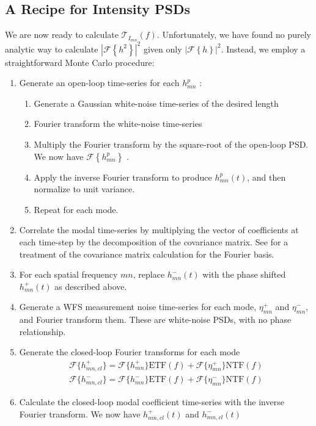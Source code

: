 \documentclass[11pt,preprint]{aastex}
\begin{document}
\subsection{A Recipe for Intensity PSDs}
We are now ready to calculate $\mathcal{T}_{I_{mn}}(f)$.  Unfortunately, we have found no purely analytic way to calculate $\left| \mathcal{F}\left\{ h^2 \right\} \right|^2$ given only $\left| \mathcal{F}\left\{ h \right\} \right|^2$.  Instead, we employ a straightforward Monte Carlo procedure:
\begin{enumerate}
\item Generate an open-loop time-series for each $h_{mn}^p$ \label{step:olh}:
\begin{enumerate}
\item Generate a Gaussian white-noise time-series of the desired length
\item Fourier transform the white-noise time-series
\item Multiply the Fourier transform by the square-root of the open-loop PSD.  We now have $\mathcal{F}\left\{h_{mn}^p\right\}$ \citep[cf.][]{kasdin_falpha}.
\item Apply the inverse Fourier transform to produce $h_{mn}^p(t)$, and then normalize to unit variance.
\item Repeat for each mode.
\end{enumerate}
\item Correlate the modal time-series by multiplying the vector of coefficients at each time-step by the decomposition of the covariance matrix.  See \citet{2018JATIS...4a9001M} for a treatment of the covariance matrix calculation for the Fourier basis.
\item For each spatial frequency $mn$, replace $h_{mn}^-(t)$ with the phase shifted $h_{mn}^+(t)$ as described above.
\item Generate a WFS measurement noise time-series for each mode, $\eta_{mn}^+$ and $\eta_{mn}^-$, and Fourier transform them.  These are white-noise PSDs, with no phase relationship.
\item Generate the closed-loop Fourier transforms for each mode \label{step:clh}
\begin{eqnarray}
\mathcal{F}\{h_{mn,cl}^+\} = \mathcal{F}\{h_{mn}^+\} \mathrm{ETF}(f) + \mathcal{F}\{\eta_{mn}^+\} \mathrm{NTF}(f) \\
\mathcal{F}\{h_{mn,cl}^-\} = \mathcal{F}\{h_{mn}^-\} \mathrm{ETF}(f) + \mathcal{F}\{\eta_{mn}^-\} \mathrm{NTF}(f) \nonumber
\end{eqnarray}
\item Calculate the closed-loop modal coefficient time-series with the inverse Fourier transform.  We now have $h_{mn,cl}^+(t)$ and $h_{mn,cl}^-(t)$ 

\end{enumerate}
\end{document}
